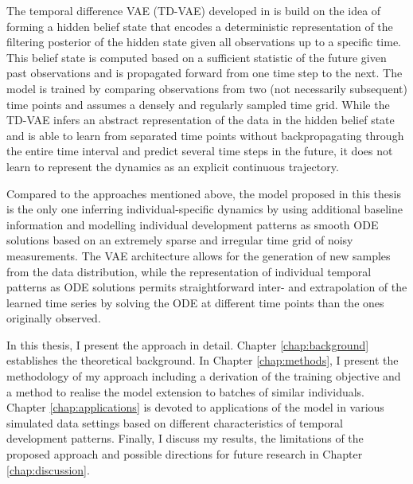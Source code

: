 The temporal difference VAE (TD-VAE) developed in \cite{Gregor2018} is build on the idea of forming a hidden belief state that encodes a deterministic representation of the filtering posterior of the hidden state given all observations up to a specific time. This belief state is computed based on a sufficient statistic of the future given past observations and is propagated forward from one time step to the next. The model is trained by comparing observations from two (not necessarily subsequent) time points and assumes a densely and regularly sampled time grid. While the TD-VAE infers an abstract representation of the data in the hidden belief state and is able to learn from separated time points without backpropagating through the entire time interval and predict several time steps in the future, it does not learn to represent the dynamics as an explicit continuous trajectory.

Compared to the approaches mentioned above, the model proposed in this thesis is the only one inferring individual-specific dynamics by using additional baseline information and modelling individual development patterns as smooth ODE solutions based on an extremely sparse and irregular time grid of noisy measurements. The VAE architecture allows for the generation of new samples from the data distribution, while the representation of individual temporal patterns as ODE solutions permits straightforward inter- and extrapolation of the learned time series by solving the ODE at different time points than the ones originally observed.

In this thesis, I present the approach in detail. Chapter \ref{chap:background} establishes the theoretical background. In Chapter \ref{chap:methods}, I present the methodology of my approach including a derivation of the training objective and a method to realise the model extension to batches of similar individuals. 
Chapter \ref{chap:applications} is devoted to applications of the model in various simulated data settings based on different characteristics of temporal development patterns. Finally, I discuss my results, the limitations of the proposed approach and possible directions for future research in Chapter \ref{chap:discussion}. 